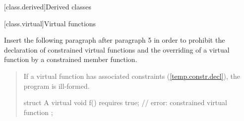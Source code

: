 
\setcounter{chapter}{9}
[class.derived]{Derived classes}

\setcounter{section}{2}
[class.virtual]{Virtual functions}

Insert the following paragraph after paragraph 5 in order to
prohibit the declaration of constrained virtual functions and
the overriding of a virtual function by a constrained member
function.

\begin{quote}
\begin{addedblock}
\setcounter{Paras}{5}

\pnum
If a virtual function has associated constraints (\ref{temp.constr.decl}), the 
program is ill-formed.
%
\enterexample
\begin{codeblock}
struct A {
  virtual void f() requires true; // error: constrained virtual function
};
\end{codeblock}
\exitexample
\end{addedblock}
\end{quote}


